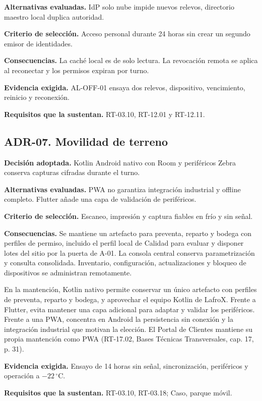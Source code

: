 \textbf{Alternativas evaluadas.} IdP solo nube impide nuevos relevos, directorio maestro local duplica autoridad.

\textbf{Criterio de selección.} Acceso personal durante 24 horas sin crear un segundo emisor de identidades.

\textbf{Consecuencias.} La caché local es de solo lectura. La revocación remota se aplica al reconectar y los permisos expiran por turno.

\textbf{Evidencia exigida.} AL-OFF-01 ensaya dos relevos, dispositivo, vencimiento, reinicio y reconexión.

\textbf{Requisitos que la sustentan.} RT-03.10, RT-12.01 y RT-12.11.

\subsection*{ADR-07. Movilidad de terreno}
\label{sub:adr-07}
\textbf{Decisión adoptada.} Kotlin Android nativo con Room y periféricos Zebra conserva capturas cifradas durante el turno.

\textbf{Alternativas evaluadas.} PWA no garantiza integración industrial y offline completo. Flutter añade una capa de validación de periféricos.

\textbf{Criterio de selección.} Escaneo, impresión y captura fiables en frío y sin señal.

\textbf{Consecuencias.} Se mantiene un artefacto para preventa, reparto y bodega con perfiles de permiso, incluido el perfil local de Calidad para evaluar y disponer lotes del sitio por la puerta de A-01. La consola central conserva parametrización y consulta consolidada. Inventario, configuración, actualizaciones y bloqueo de dispositivos se administran remotamente.

En la mantención, Kotlin nativo permite conservar un único artefacto con perfiles de preventa, reparto y bodega, y aprovechar el equipo Kotlin de LafroX. Frente a Flutter, evita mantener una capa adicional para adaptar y validar los periféricos. Frente a una PWA, concentra en Android la persistencia sin conexión y la integración industrial que motivan la elección. El Portal de Clientes mantiene su propia mantención como PWA (RT-17.02, Bases Técnicas Transversales, cap. 17, p. 31).

\textbf{Evidencia exigida.} Ensayo de 14 horas sin señal, sincronización, periféricos y operación a $-22\,^\circ$C.

\textbf{Requisitos que la sustentan.} RT-03.10, RT-03.18; Caso, parque móvil.


